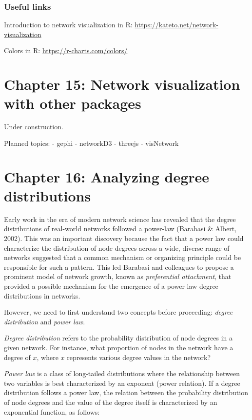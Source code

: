 \documentclass[
]{book}
\begin{document}
\subsection{Useful links}\label{useful-links}

Introduction to network visualization in R: \url{https://kateto.net/network-visualization}

Colors in R: \url{https://r-charts.com/colors/}

\chapter{Chapter 15: Network visualization with other packages}\label{ch15}

Under construction.

Planned topics:
- gephi
- networkD3
- threejs
- visNetwork

\chapter{Chapter 16: Analyzing degree distributions}\label{ch16}

Early work in the era of modern network science has revealed that the degree distributions of real-world networks followed a power-law (Barabasi \& Albert, 2002). This was an important discovery because the fact that a power law could characterize the distribution of node degrees across a wide, diverse range of networks suggested that a common mechanism or organizing principle could be responsible for such a pattern. This led Barabasi and colleagues to propose a prominent model of network growth, known as \emph{preferential attachment}, that provided a possible mechanism for the emergence of a power law degree distributions in networks.

However, we need to first understand two concepts before proceeding: \emph{degree distribution} and \emph{power law}.

\emph{Degree distribution} refers to the probability distribution of node degrees in a given network. For instance, what proportion of nodes in the network have a degree of \(x\), where \(x\) represents various degree values in the network?

\emph{Power law} is a class of long-tailed distributions where the relationship between two variables is best characterized by an exponent (power relation). If a degree distribution follows a power law, the relation between the probability distribution of node degrees and the value of the degree itself is characterized by an exponential function, as follows:
\end{document}
